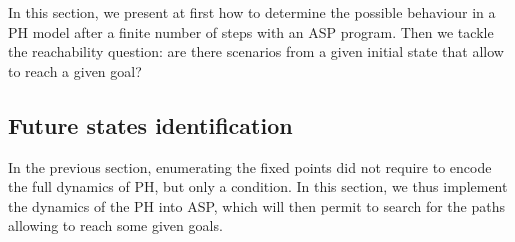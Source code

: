 
In this section, we present at first how to determine the possible behaviour in a PH model after a finite number of steps with an ASP program.
Then we tackle the reachability question: are there scenarios from a given initial state
that allow to reach a given goal?

\subsection{Future states identification}
In the previous section, enumerating the fixed points did not require to
encode the full dynamics of PH, but only a condition.
In this section, we thus implement the dynamics of the PH into ASP,
which will then permit to search for the paths allowing to reach some given goals.

